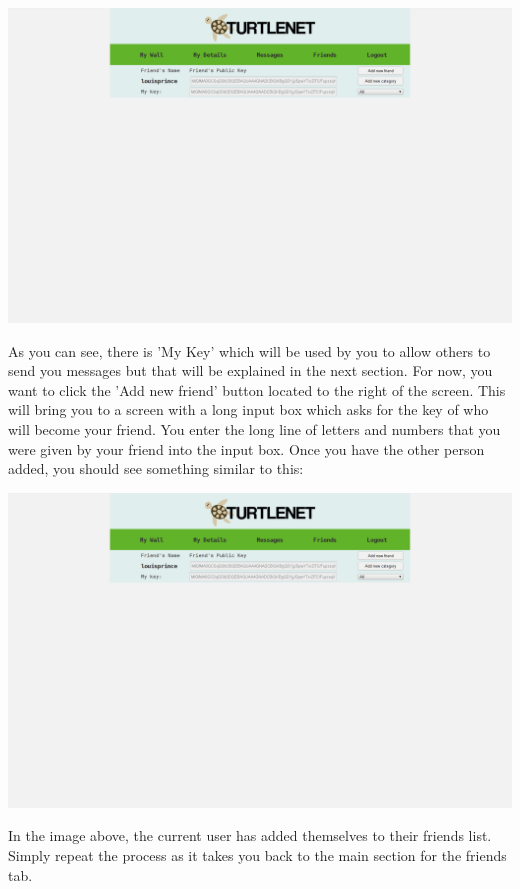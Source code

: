 \includegraphics[scale=0.2]{../Screenshots/Screenshot from 2014-04-29 22-31-10}

As you can see, there is 'My Key' which will be used by you to allow others to
send you messages but that will be explained in the next section.  For now, you
want to click the 'Add new friend' button located to the right of the screen.
This will bring you to a screen with a long input box which asks for the key of
who will become your friend.  You enter the long line of letters and numbers
that you were given by your friend into the input box.  Once you have the other
person added, you should see something similar to this:

\includegraphics[scale=0.2]{../Screenshots/Screenshot from 2014-04-29 22-31-10}

In the image above, the current user has added themselves to their friends list.
Simply repeat the process as it takes you back to the main section for the
friends tab.

